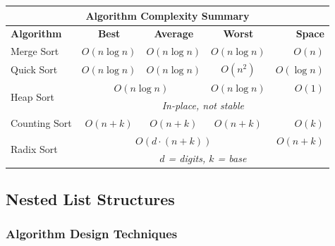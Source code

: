 \begin{tabular}{|l|c|c|c|r|}
\hline
\multicolumn{5}{|c|}{\textbf{Algorithm Complexity Summary}} \\
\hline
\textbf{Algorithm} & \textbf{Best} & \textbf{Average} & \textbf{Worst} & \textbf{Space} \\
\hline
Merge Sort & $O(n \log n)$ & $O(n \log n)$ & $O(n \log n)$ & $O(n)$ \\
\hline
Quick Sort & $O(n \log n)$ & $O(n \log n)$ & $O(n^2)$ & $O(\log n)$ \\
\hline
\multirow{2}{*}{Heap Sort} & \multicolumn{2}{c|}{$O(n \log n)$} & $O(n \log n)$ & $O(1)$ \\
\cline{2-5}
 & \multicolumn{4}{c|}{\textit{In-place, not stable}} \\
\hline
Counting Sort & $O(n+k)$ & $O(n+k)$ & $O(n+k)$ & $O(k)$ \\
\hline
\multirow{2}{*}{Radix Sort} & \multicolumn{3}{c|}{$O(d \cdot (n+k))$} & $O(n+k)$ \\
\cline{2-5}
 & \multicolumn{4}{c|}{\textit{$d$ = digits, $k$ = base}} \\
\hline
\end{tabular}

\subsection{Nested List Structures}

\subsubsection{Algorithm Design Techniques}

